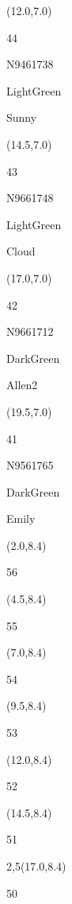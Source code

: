 \documentclass[a4paper]{article}
\newcommand{\myseat}[4]{%
\vspace{-0.1cm} \hspace{-0.5cm}
\parbox[t][2.2cm][t]{3.5cm}{%
\small #1 %
\begin{description}
\vspace{-0.1cm}
\item [ID:] #2
\vspace{-0.1cm}
\item [Team:] #3 \normalsize
\vspace{-0.1cm}
\item \normalsize #4
\vspace{-0.1cm}
\end{description}
}
}
\begin{document}
\begin{textblock}{2.5}(12.0,7.0)
\myseat{44}{N9461738}{LightGreen}{Sunny}
\end{textblock}

\begin{textblock}{2.5}(14.5,7.0)
\myseat{43}{N9661748}{LightGreen}{Cloud}
\end{textblock}

\begin{textblock}{2.5}(17.0,7.0)
\myseat{42}{N9661712}{DarkGreen}{Allen2}
\end{textblock}

\begin{textblock}{2.5}(19.5,7.0)
\myseat{41}{N9561765}{DarkGreen}{Emily}
\end{textblock}


\begin{textblock}{2.5}(2.0,8.4)
\textblockcolor{}
\myseat{56}{}{}{}
\end{textblock}

\begin{textblock}{2.5}(4.5,8.4)
\textblockcolor{}
\myseat{55}{}{}{}
\end{textblock}

\begin{textblock}{2.5}(7.0,8.4)
\textblockcolor{}
\myseat{54}{}{}{}
\end{textblock}

\begin{textblock}{2.5}(9.5,8.4)
\textblockcolor{}
\myseat{53}{}{}{}
\end{textblock}

\begin{textblock}{2.5}(12.0,8.4)
\textblockcolor{}
\myseat{52}{}{}{}
\end{textblock}

\begin{textblock}{2.5}(14.5,8.4)
\textblockcolor{}
\myseat{51}{}{}{}
\end{textblock}

\begin{textblock}{2,5}(17.0,8.4)
\textblockcolor{}
\myseat{50}{}{}{}
\end{textblock}
\end{document}
